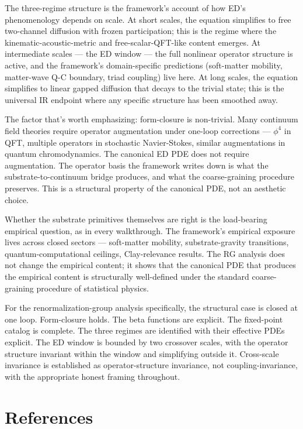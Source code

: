 \documentclass[11pt,a4paper]{article}
\begin{document}
The three-regime structure is the framework's account of how ED's phenomenology depends on scale. At short scales, the equation simplifies to free two-channel diffusion with frozen participation; this is the regime where the kinematic-acoustic-metric and free-scalar-QFT-like content emerges. At intermediate scales --- the ED window --- the full nonlinear operator structure is active, and the framework's domain-specific predictions (soft-matter mobility, matter-wave Q-C boundary, triad coupling) live here. At long scales, the equation simplifies to linear gapped diffusion that decays to the trivial state; this is the universal IR endpoint where any specific structure has been smoothed away.

The factor that's worth emphasizing: form-closure is non-trivial. Many continuum field theories require operator augmentation under one-loop corrections --- $\phi^4$ in QFT, multiple operators in stochastic Navier-Stokes, similar augmentations in quantum chromodynamics. The canonical ED PDE does not require augmentation. The operator basis the framework writes down is what the substrate-to-continuum bridge produces, and what the coarse-graining procedure preserves. This is a structural property of the canonical PDE, not an aesthetic choice.

Whether the substrate primitives themselves are right is the load-bearing empirical question, as in every walkthrough. The framework's empirical exposure lives across closed sectors --- soft-matter mobility, substrate-gravity transitions, quantum-computational ceilings, Clay-relevance results. The RG analysis does not change the empirical content; it shows that the canonical PDE that produces the empirical content is structurally well-defined under the standard coarse-graining procedure of statistical physics.

For the renormalization-group analysis specifically, the structural case is closed at one loop. Form-closure holds. The beta functions are explicit. The fixed-point catalog is complete. The three regimes are identified with their effective PDEs explicit. The ED window is bounded by two crossover scales, with the operator structure invariant within the window and simplifying outside it. Cross-scale invariance is established as operator-structure invariance, not coupling-invariance, with the appropriate honest framing throughout.

\section{References}
\end{document}
